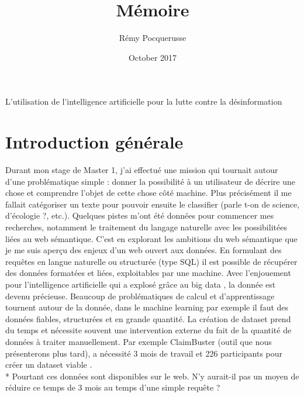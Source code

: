 \documentclass[12pt]{article}
\title{Mémoire}
\author{Rémy Pocquerusse}
\date{October 2017}
\begin{document}
\maketitle

\par\hfil\null\par
\par\hfil\null\par
\par\hfil\null\par

\begin{center}
{\huge L'utilisation de l'intelligence artificielle pour la lutte contre la désinformation}
\end{center}

\clearpage

\renewcommand*\contentsname{Sommaire}

\clearpage

\tableofcontents

\clearpage

\section{Introduction générale}

Durant mon stage de Master 1, j'ai effectué une mission qui tournait autour d'une problématique simple : donner la possibilité à un utilisateur de décrire une chose et comprendre l'objet de cette chose côté machine. Plus précisément il me fallait catégoriser un texte pour pouvoir ensuite le classifier (parle t-on de science, d'écologie ?, etc.). Quelques pistes m'ont été données pour commencer mes recherches, notamment le traitement du langage naturelle avec les possibilitées liées au web sémantique. C'est en explorant les ambitions du web sémantique que je me suis aperçu des enjeux d'un web ouvert aux données. En formulant des requêtes en langue naturelle ou structurée (type SQL) il est possible de récupérer des données formatées et liées, exploitables par une machine. Avec l'enjouement pour l'intelligence artificielle qui a explosé grâce au big data \cite{sh}, la donnée est devenu précieuse. Beaucoup de problématiques de calcul et d'apprentissage tournent autour de la donnée, dans le machine learning par exemple il faut des données fiables, structurées et en grande quantité. La création de dataset prend du temps et nécessite souvent une intervention externe du fait de la quantité de données à traiter manuellement. Par exemple ClaimBuster (outil que nous présenterons plus tard), a nécessité 3 mois de travail et 226 participants pour créer un dataset viable \cite{hassan2015quest}.
\\*
Pourtant ces données sont disponibles sur le web. N'y aurait-il pas un moyen de réduire ce temps de 3 mois au temps d'une simple requête ?
\end{document}
